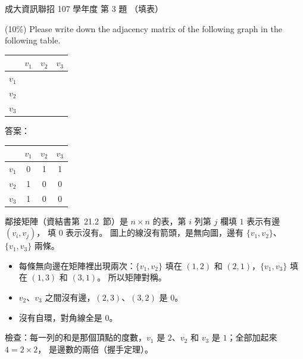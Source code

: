 \begin{pastexam}[label={px:ncku-107-prog-03}]{成大資訊聯招 107 學年度 第 3 題}
（填表）

(10\%) Please write down the adjacency matrix of the following graph in the following table.

\begin{center}

\vspace{6pt}
\begin{tabular}{|c|c|c|c|}
\hline
 & $v_1$ & $v_2$ & $v_3$ \\ \hline
$v_1$ & \hspace{2em} & \hspace{2em} & \hspace{2em} \\ \hline
$v_2$ & & & \\ \hline
$v_3$ & & & \\ \hline
\end{tabular}
\end{center}
\end{pastexam}

\begin{pastsoln}
答案：
\begin{center}
\begin{tabular}{|c|c|c|c|}
\hline
 & $v_1$ & $v_2$ & $v_3$ \\ \hline
$v_1$ & 0 & 1 & 1 \\ \hline
$v_2$ & 1 & 0 & 0 \\ \hline
$v_3$ & 1 & 0 & 0 \\ \hline
\end{tabular}
\end{center}

鄰接矩陣（資結書第~21.2~節）是 $n \times n$ 的表，第 $i$ 列第 $j$ 欄填 $1$ 表示有邊 $(v_i, v_j)$，
填 $0$ 表示沒有。 圖上的線沒有箭頭，是無向圖，邊有 $\{v_1, v_2\}$、$\{v_1, v_3\}$ 兩條。
\begin{itemize}
\item 每條無向邊在矩陣裡出現兩次：$\{v_1, v_2\}$ 填在 $(1,2)$ 和 $(2,1)$，$\{v_1, v_3\}$ 填在
$(1,3)$ 和 $(3,1)$。 所以矩陣對稱。
\item $v_2$、$v_3$ 之間沒有邊，$(2,3)$、$(3,2)$ 是 $0$。
\item 沒有自環，對角線全是 $0$。
\end{itemize}
檢查：每一列的和是那個頂點的度數，$v_1$ 是 $2$、$v_2$ 和 $v_3$ 是 $1$；全部加起來 $4 = 2 \times 2$，
是邊數的兩倍（握手定理）。
\end{pastsoln}
